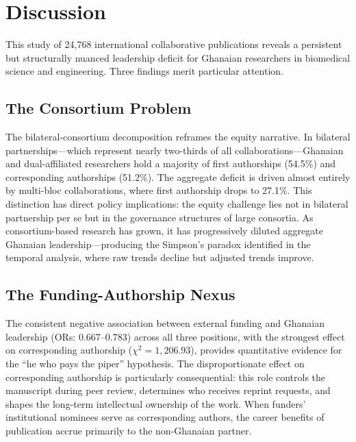 \documentclass[12pt, a4paper]{article}
\begin{document}
\section{Discussion}

This study of 24,768 international collaborative publications reveals a persistent but structurally nuanced leadership deficit for Ghanaian researchers in biomedical science and engineering. Three findings merit particular attention.

\subsection{The Consortium Problem}

The bilateral-consortium decomposition reframes the equity narrative. In bilateral partnerships---which represent nearly two-thirds of all collaborations---Ghanaian and dual-affiliated researchers hold a majority of first authorships (54.5\%) and corresponding authorships (51.2\%). The aggregate deficit is driven almost entirely by multi-bloc collaborations, where first authorship drops to 27.1\%. This distinction has direct policy implications: the equity challenge lies not in bilateral partnership per se but in the governance structures of large consortia. As consortium-based research has grown, it has progressively diluted aggregate Ghanaian leadership---producing the Simpson's paradox identified in the temporal analysis, where raw trends decline but adjusted trends improve.

\subsection{The Funding-Authorship Nexus}

The consistent negative association between external funding and Ghanaian leadership (ORs: 0.667--0.783) across all three positions, with the strongest effect on corresponding authorship ($\chi^2 = 1{,}206.93$), provides quantitative evidence for the ``he who pays the piper'' hypothesis. The disproportionate effect on corresponding authorship is particularly consequential: this role controls the manuscript during peer review, determines who receives reprint requests, and shapes the long-term intellectual ownership of the work. When funders' institutional nominees serve as corresponding authors, the career benefits of publication accrue primarily to the non-Ghanaian partner.
\end{document}
